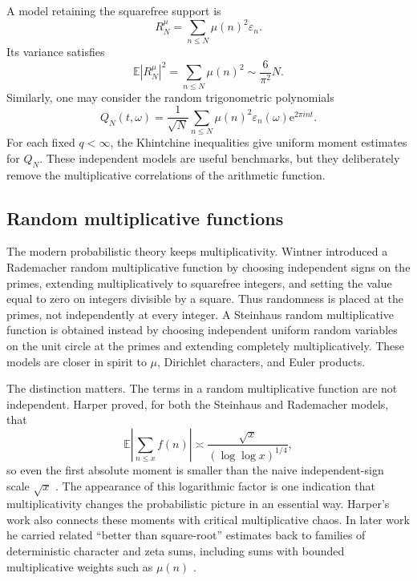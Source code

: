 \documentclass[11pt]{article}
\theoremstyle{remark}
\newcommand{\E}{\mathbb E}
\newcommand{\e}{\mathrm e}
\begin{document}
A model retaining the squarefree support is
\[
 R_N^\mu=\sum_{n\leq N}\mu(n)^2\varepsilon_n.
\]
Its variance satisfies
\[
 \E|R_N^\mu|^2
 =\sum_{n\leq N}\mu(n)^2
 \sim\frac6{\pi^2}N.
\]
Similarly, one may consider the random trigonometric polynomials
\[
 Q_N(t,\omega)
 =
 \frac1{\sqrt N}
 \sum_{n\leq N}\mu(n)^2\varepsilon_n(\omega)\e^{2\pi i nt}.
\]
For each fixed \(q<\infty\), the Khintchine inequalities
\cite{Khinchin,Kahane} give uniform moment estimates for \(Q_N\).
These independent models are useful benchmarks, but they deliberately
remove the multiplicative correlations of the arithmetic function.

\subsection{Random multiplicative functions}

The modern probabilistic theory keeps multiplicativity.  Wintner
\cite{Wintner} introduced a Rademacher random multiplicative function
by choosing independent signs on the primes, extending
multiplicatively to squarefree integers, and setting the value equal to
zero on integers divisible by a square.  Thus randomness is placed at
the primes, not independently at every integer.  A Steinhaus random
multiplicative function is obtained instead by choosing independent
uniform random variables on the unit circle at the primes and extending
completely multiplicatively.  These models are closer in spirit to
\(\mu\), Dirichlet characters, and Euler products.

The distinction matters.  The terms in a random multiplicative
function are not independent.  Harper proved, for both the Steinhaus
and Rademacher models, that
\begin{equation}\label{eq:harper-first-moment}
 \E\left|\sum_{n\leq x} f(n)\right|
 \asymp
 \frac{\sqrt{x}}{(\log\log x)^{1/4}},
\end{equation}
so even the first absolute moment is smaller than the naive
independent-sign scale \(\sqrt{x}\) \cite{HarperLowMoments}.  The
appearance of this logarithmic factor is one indication that
multiplicativity changes the probabilistic picture in an essential
way.  Harper's work also connects these moments with critical
multiplicative chaos.  In later work he carried related ``better than
square-root'' estimates back to families of deterministic character and
zeta sums, including sums with bounded multiplicative weights such as
\(\mu(n)\) \cite{HarperTypical}.
\end{document}
